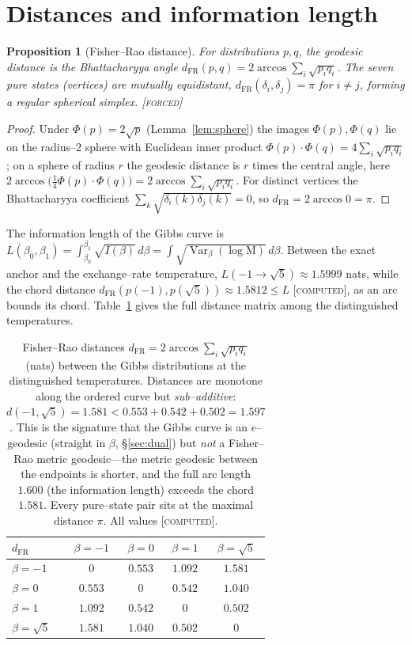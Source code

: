 \documentclass[11pt]{article}
\newtheorem{proposition}[theorem]{Proposition}
\theoremstyle{definition}
\newcommand{\Mah}{\mathrm{M}}
\newcommand{\Var}{\operatorname{Var}}
\newcommand{\forcedtag}{{\scshape [forced]}}
\newcommand{\computedtag}{{\scshape [computed]}}
\begin{document}
\section{Distances and information length}
\begin{proposition}[Fisher--Rao distance]\label{prop:dist}
For distributions $p,q$, the geodesic distance is the Bhattacharyya angle
$d_{\mathrm{FR}}(p,q)=2\arccos\sum_i\sqrt{p_i q_i}$. The seven pure states (vertices) are mutually
equidistant, $d_{\mathrm{FR}}(\delta_i,\delta_j)=\pi$ for $i\neq j$, forming a regular spherical
simplex. \forcedtag
\end{proposition}
\begin{proof}
Under $\Phi(p)=2\sqrt p$ (Lemma~\ref{lem:sphere}) the images $\Phi(p),\Phi(q)$ lie on the radius--2
sphere with Euclidean inner product $\Phi(p)\cdot\Phi(q)=4\sum_i\sqrt{p_iq_i}$; on a sphere of radius
$r$ the geodesic distance is $r$ times the central angle, here
$2\arccos\!\big(\tfrac14\Phi(p)\cdot\Phi(q)\big)=2\arccos\sum_i\sqrt{p_iq_i}$. For distinct vertices
the Bhattacharyya coefficient $\sum_k\sqrt{\delta_i(k)\delta_j(k)}=0$, so
$d_{\mathrm{FR}}=2\arccos 0=\pi$.
\end{proof}
The information length of the Gibbs curve is $L(\beta_0,\beta_1)=\int_{\beta_0}^{\beta_1}
\sqrt{I(\beta)}\,d\beta=\int\!\sqrt{\Var_\beta(\log\Mah)}\,d\beta$. Between the exact anchor and the
exchange--rate temperature, $L(-1\to\sqrt5)\approx1.5999$ nats, while the chord distance
$d_{\mathrm{FR}}(p(-1),p(\sqrt5))\approx1.5812\le L$ \computedtag, as an arc bounds its chord.
Table~\ref{tab:dist} gives the full distance matrix among the distinguished temperatures.

\begin{table}[h]\centering
\begin{tabular}{lcccc}
\toprule
$d_{\mathrm{FR}}$ & $\beta=-1$ & $\beta=0$ & $\beta=1$ & $\beta=\sqrt5$\\ \midrule
$\beta=-1$ & $0$ & $0.553$ & $1.092$ & $1.581$\\
$\beta=0$ & $0.553$ & $0$ & $0.542$ & $1.040$\\
$\beta=1$ & $1.092$ & $0.542$ & $0$ & $0.502$\\
$\beta=\sqrt5$ & $1.581$ & $1.040$ & $0.502$ & $0$\\
\bottomrule
\end{tabular}
\caption{Fisher--Rao distances $d_{\mathrm{FR}}=2\arccos\sum_i\sqrt{p_iq_i}$ (nats) between the Gibbs
distributions at the distinguished temperatures. Distances are monotone along the ordered curve but
\emph{sub--additive}: $d(-1,\sqrt5)=1.581<0.553+0.542+0.502=1.597$. This is the signature that the
Gibbs curve is an $e$--geodesic (straight in $\beta$, \S\ref{sec:dual}) but \emph{not} a Fisher--Rao
metric geodesic---the metric geodesic between the endpoints is shorter, and the full arc length
$1.600$ (the information length) exceeds the chord $1.581$. Every pure--state pair sits at the
maximal distance $\pi$. All values \computedtag.}\label{tab:dist}
\end{table}
\end{document}
